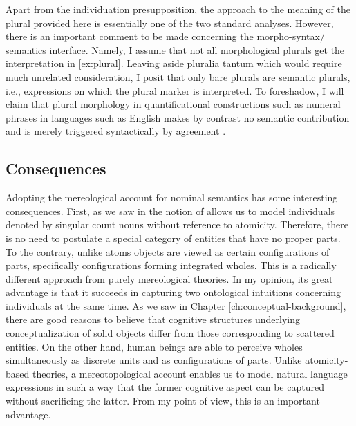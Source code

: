	Apart from the individuation presupposition, the approach to the meaning of the plural provided here is essentially one of the two standard analyses. However, there is an important comment to be made concerning the morpho-syntax/ semantics interface. Namely, I assume that not all morphological plurals get the interpretation in \ref{ex:plural}. Leaving aside pluralia tantum which would require much unrelated consideration, I posit that only bare plurals are semantic plurals, i.e., expressions on which the plural marker is interpreted. To foreshadow, I will claim that plural morphology in quantificational constructions such as numeral phrases in languages such as English makes by contrast no semantic contribution and is merely triggered syntactically by agreement \citep[see, e.g.,][]{krifka1989nominal,krifka2007masses,ionin_matushansky2006singular,deal2017countability}.
	
	\subsection{Consequences}\label{sec:consequences}
	
	Adopting the mereological account for nominal semantics has some interesting consequences. First, as we saw in  the notion of  allows us to model individuals denoted by singular count nouns without reference to atomicity. Therefore, there is no need to postulate a special category of entities that have no proper parts. To the contrary, unlike atoms  objects are viewed as certain configurations of parts, specifically configurations forming integrated wholes. This is a radically different approach from purely mereological theories. In my opinion, its great advantage is that it succeeds in capturing two ontological intuitions concerning individuals at the same time. As we saw in Chapter \ref{ch:conceptual-background}, there are good reasons to believe that cognitive structures underlying conceptualization of solid objects differ from those corresponding to scattered entities. On the other hand, human beings are able to perceive wholes simultaneously as discrete units and as configurations of parts. Unlike atomicity-based theories, a mereotopological account enables us to model natural language expressions in such a way that the former cognitive aspect can be captured without sacrificing the latter. From my point of view, this is an important advantage.
	
